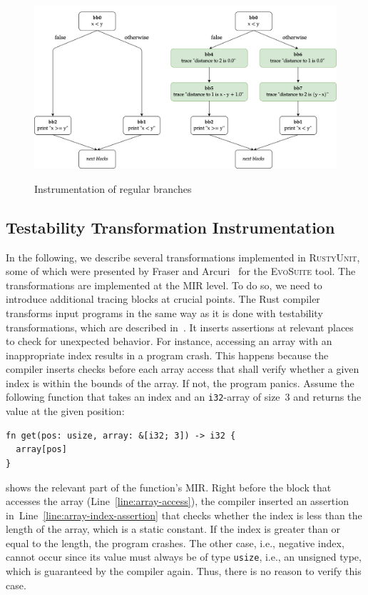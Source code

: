 \documentclass[paper=a4,%
  twoside,%
  BCOR4mm,%
  abstract=true,%
  toc=bibliography,%
  chapterprefix=true,%
  toc=bibliographynumbered,%
  open=right,%
  english,%
  pagesize=pdftex]{scrreprt}
\newcommand{\tech}{\textsc{RustyUnit}\xspace}
\newcommand{\mir}{\ac{MIR}\xspace}
\begin{document}
\begin{figure}[h]
\caption{Instrumentation of regular branches}
\centering
\includegraphics[width=\textwidth]{comparison-instrumented-branch-cfg}
\label{fig:comparison-instrumented-branch-cfg}
\end{figure}

\subsection{Testability Transformation Instrumentation}
\label{sec:mir-testability-transformations}
In the following, we describe several transformations implemented in \tech, some of which were presented by Fraser and Arcuri~\cite{Fraser2013} for the \textsc{EvoSuite} tool. The transformations are implemented at the \mir level. To do so, we need to introduce additional tracing blocks at crucial points. The Rust compiler transforms input programs in the same way as it is done with testability transformations, which are described in~. It inserts assertions at relevant places to check for unexpected behavior. For instance, accessing an array with an inappropriate index results in a program crash. This happens because the compiler inserts checks before each array access that shall verify whether a given index is within the bounds of the array. If not, the program panics. Assume the following function that takes an index and an \texttt{i32}-array of size~$3$ and returns the value at the given position:

\begin{lstlisting}[style=boxed, caption={}, label=lst:array-index-access-example]
fn get(pos: usize, array: &[i32; 3]) -> i32 {
  array[pos]
}
\end{lstlisting}

 shows the relevant part of the function's \mir. Right before the block that accesses the array (Line~\ref{line:array-access}), the compiler inserted an assertion in~Line~\ref{line:array-index-assertion} that checks whether the index is less than the length of the array, which is a static constant. If the index is greater than or equal to the length, the program crashes. The other case, i.e., negative index, cannot occur since its value must always be of type \texttt{usize}, i.e., an unsigned type, which is guaranteed by the compiler again. Thus, there is no reason to verify this case.
\end{document}
